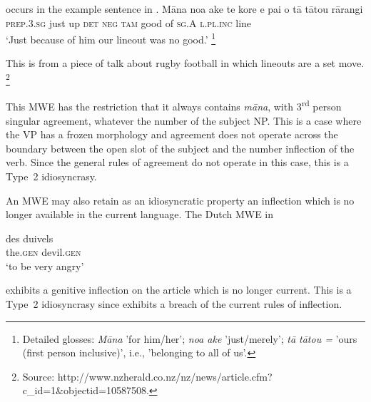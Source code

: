 \documentclass[output=paper]{langsci/langscibook}
\begin{document}
\noindent
occurs in the 
example sentence in .
\ea\label{ex:ex16b}
\gll %
M\=ana      noa ake te     kore e         pai    o  t\=a     t\=atou        r\=arangi\\
\textsc{prep}.\textsc{3.sg}  just up  \textsc{det} \textsc{neg} \textsc{tam}  good of \textsc{sg.A} \textsc{l.pl.inc}  line\\
\glt ‘Just because of him our lineout was no good.’%
\footnote{Detailed glosses: 
\textit{M\=ana} 'for him/her'; 
\textit{noa ake} 'just/merely'; 
\textit{t\=a t\=atou =} 'ours (first person inclusive)', i.e., 'belonging to all of us'.
}
\z


\noindent
This is from a piece of talk about rugby football in which lineouts are a set move.%
\footnote{Source: http://www.nzherald.co.nz/nz/news/article.cfm?c\_id=1\&objectid=10587508.}


This MWE has the restriction that it always contains \textit{m\=ana}, with 3\textsuperscript{rd} person singular agreement, whatever the number of the subject NP. This is a case where the VP has a frozen morphology and agreement does not operate across the boundary between the open slot of the subject and the number inflection of the verb. Since the general rules of agreement do not operate in this case, this is a Type~2 idiosyncrasy.

An MWE may also retain as an idiosyncratic property an inflection which is no longer available in the current language. The Dutch MWE in  

\ea
\label{ex:ex17}\gll des duivels\\
     the.\textsc{gen} devil.\textsc{gen}\\
\glt ‘to be very angry’ 
\z

\noindent
exhibits a genitive inflection  on the article which is no longer current. This is a Type~2 idiosyncrasy since  exhibits a breach of the current rules of inflection.
\end{document}
